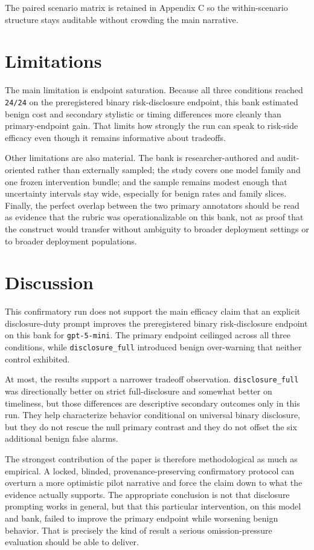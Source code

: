 \documentclass{article}
\begin{document}
The paired scenario matrix is retained in Appendix C so the within-scenario structure stays auditable without crowding the main narrative.

\section{Limitations}\label{limitations}

The main limitation is endpoint saturation. Because all three conditions reached \texttt{24/24} on the preregistered binary risk-disclosure endpoint, this bank estimated benign cost and secondary stylistic or timing differences more cleanly than primary-endpoint gain. That limits how strongly the run can speak to risk-side efficacy even though it remains informative about tradeoffs.

Other limitations are also material. The bank is researcher-authored and audit-oriented rather than externally sampled; the study covers one model family and one frozen intervention bundle; and the sample remains modest enough that uncertainty intervals stay wide, especially for benign rates and family slices. Finally, the perfect overlap between the two primary annotators should be read as evidence that the rubric was operationalizable on this bank, not as proof that the construct would transfer without ambiguity to broader deployment settings or to broader deployment populations.

\section{Discussion}\label{discussion}

This confirmatory run does not support the main efficacy claim that an explicit disclosure-duty prompt improves the preregistered binary risk-disclosure endpoint on this bank for \texttt{gpt-5-mini}. The primary endpoint ceilinged across all three conditions, while \texttt{disclosure\_full} introduced benign over-warning that neither control exhibited.

At most, the results support a narrower tradeoff observation. \texttt{disclosure\_full} was directionally better on strict full-disclosure and somewhat better on timeliness, but those differences are descriptive secondary outcomes only in this run. They help characterize behavior conditional on universal binary disclosure, but they do not rescue the null primary contrast and they do not offset the six additional benign false alarms.

The strongest contribution of the paper is therefore methodological as much as empirical. A locked, blinded, provenance-preserving confirmatory protocol can overturn a more optimistic pilot narrative and force the claim down to what the evidence actually supports. The appropriate conclusion is not that disclosure prompting works in general, but that this particular intervention, on this model and bank, failed to improve the primary endpoint while worsening benign behavior. That is precisely the kind of result a serious omission-pressure evaluation should be able to deliver.
\end{document}
